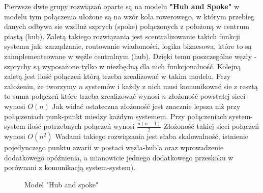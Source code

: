 Pierwsze dwie grupy rozwiązań oparte są na modelu \textbf{"Hub and Spoke"}  w modelu tym połączenia ułożone są na wzór koła rowerowego, w którym przebieg danych odbywa sie wzdłuż szprych (spoke) połączonych z położoną w centrum piastą (hub). Zaletą takiego rozwiązania jest scentralizowanie takich funkcji systemu jak: zarządzanie, routowanie wiadomości, logika biznesowa, które to są zaimplementeowane w węźle centralnym (hub). Dzięki temu poszczególne węzły - szprychy są wyposażone tylko w niezbędną dla nich funkcjonalność. Kolejną zaletą jest ilość połączeń którą trzeba zrealizować w takim modelu. Przy założeniu, że tworzymy \begin{math}n\end{math}  systemów i każdy z nich musi komunikować sie z resztą to suma połączeń które trzeba zrealizować wynosi  \begin{math}n\end{math}  złożoność powstałej sieci wynosi  \begin{math}O(n)\end{math}  Jak widać ostateczna złożoność jest znacznie lepsza niż przy połączeniach punk-punkt miedzy każdym systemem. Przy połączeniach system-system  ilość potrzebnych połączeń wynosi   \begin{math}\frac{n (n- 1)}{2}\end{math}  Złożoność takiej sieci połączeń wynosi  \begin{math}O(n^2)\end{math}  Wadami takiego rozwiązania jest słaba skalowalność, istnienie pojedynczego punktu awarii w postaci węzła-hub'a oraz wprowadzenie dodatkowego opóźnienia, a mianowicie jednego dodatkowego przeskoku w porównani z komunikacją system-system).

\setlength\fboxsep{20pt}
\setlength\fboxrule{1pt}
\begin{figure}[!h]
	\centering
	\caption{Model "Hub and spoke"}\label{fig:hub_and_spoke}
\end{figure}

